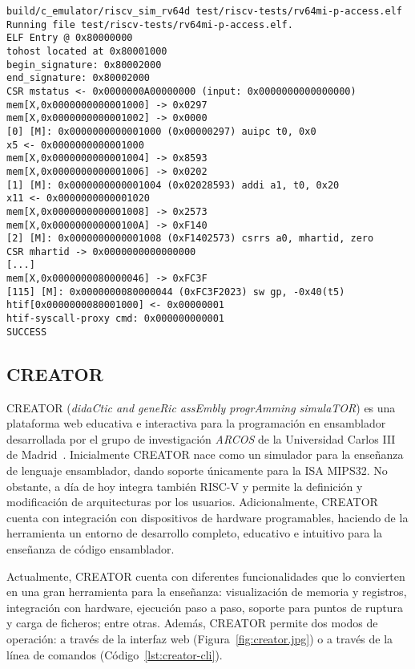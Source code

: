 \begin{lstlisting}[caption=Ejecución del simulador sail-riscv, label={lstl:sail}]
build/c_emulator/riscv_sim_rv64d test/riscv-tests/rv64mi-p-access.elf
Running file test/riscv-tests/rv64mi-p-access.elf.
ELF Entry @ 0x80000000
tohost located at 0x80001000
begin_signature: 0x80002000
end_signature: 0x80002000
CSR mstatus <- 0x0000000A00000000 (input: 0x0000000000000000)
mem[X,0x0000000000001000] -> 0x0297
mem[X,0x0000000000001002] -> 0x0000
[0] [M]: 0x0000000000001000 (0x00000297) auipc t0, 0x0
x5 <- 0x0000000000001000
mem[X,0x0000000000001004] -> 0x8593
mem[X,0x0000000000001006] -> 0x0202
[1] [M]: 0x0000000000001004 (0x02028593) addi a1, t0, 0x20
x11 <- 0x0000000000001020
mem[X,0x0000000000001008] -> 0x2573
mem[X,0x000000000000100A] -> 0xF140
[2] [M]: 0x0000000000001008 (0xF1402573) csrrs a0, mhartid, zero
CSR mhartid -> 0x0000000000000000
[...]
mem[X,0x0000000080000046] -> 0xFC3F
[115] [M]: 0x0000000080000044 (0xFC3F2023) sw gp, -0x40(t5)
htif[0x0000000080001000] <- 0x00000001
htif-syscall-proxy cmd: 0x000000000001
SUCCESS
\end{lstlisting}

\subsection{CREATOR}\label{subsec:creator}

CREATOR (\textit{didaCtic and geneRic assEmbly progrAmming simulaTOR}) es una
plataforma web educativa e interactiva para la programación en
ensamblador desarrollada por el grupo de investigación \textit{ARCOS} de la
Universidad Carlos III de Madrid~\cite{camarmas2024creator}. Inicialmente
CREATOR nace como un
simulador para la enseñanza de lenguaje ensamblador, dando soporte únicamente
para la ISA MIPS32. No obstante, a día de hoy integra también RISC-V y permite
la definición y modificación de arquitecturas por los usuarios. Adicionalmente,
CREATOR cuenta con integración con dispositivos de hardware programables, haciendo de
la herramienta un entorno de desarrollo completo, educativo e intuitivo para la enseñanza
de código ensamblador.

Actualmente, CREATOR cuenta con diferentes funcionalidades que lo convierten en
una gran herramienta para la enseñanza: visualización de memoria y registros,
integración con hardware, ejecución paso a paso, soporte para puntos de ruptura
y carga de ficheros; entre otras. Además, CREATOR permite dos modos de
operación: a través de la interfaz web (Figura~\ref{fig:creator.jpg}) o a
través de la línea de comandos (Código~\ref{lst:creator-cli}).

